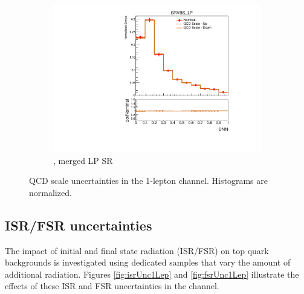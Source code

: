 \begin{figure}[ht]
\begin{subfigure}[b]{0.3\textwidth}
        \includegraphics[width=\textwidth]{figures/1lep/PDFUnc/QCDScale/Z_0ptag1pfat0pjet_0ptv_SRVBS_LP_DNN_SysTheoryQCD_Z__1up_Norm.pdf}
        \caption{\Zjets, merged LP SR}
    \end{subfigure}
    \caption{QCD scale uncertainties in the 1-lepton channel. Histograms are normalized.}
    \label{fig:PDFUnc1Lep_QCD}
\end{figure}

\clearpage
\subsection{ISR/FSR uncertainties}
\label{subsec:isr_fsr_unc}

The impact of initial and final state radiation (ISR/FSR) on top quark backgrounds is investigated using dedicated samples that vary the amount of additional radiation.
Figures \ref{fig:isrUnc1Lep} and \ref{fig:fsrUnc1Lep} illustrate the effects of these ISR and FSR uncertainties in the \olep channel.



